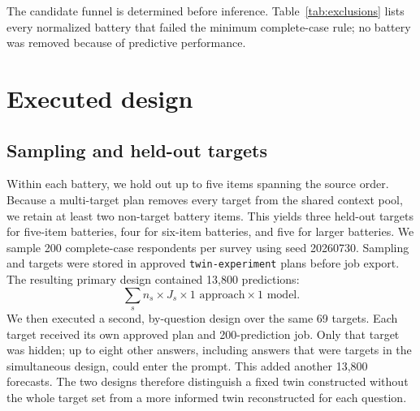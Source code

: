 \documentclass[11pt]{article}
\newcommand{\zwill}{\texttt{zwill}}
\begin{document}
\begin{table}[ht]
\centering
\scriptsize
\resizebox{\textwidth}{!}{}
\caption{Executed study cohort. Predictions equal sampled respondents times
held-out questions for one construction arm and one model.}
\label{tab:cohort}
\end{table}

The candidate funnel is determined before inference. Table~\ref{tab:exclusions}
lists every normalized battery that failed the minimum complete-case rule; no
battery was removed because of predictive performance.

\begin{table}[ht]
\centering
\small

\caption{Candidate normalized batteries excluded before plan approval and
remote inference. Reasons are read from the \zwill{} study manifest generated by
the ingestion pipeline.}
\label{tab:exclusions}
\end{table}

\section{Executed design}
\subsection{Sampling and held-out targets}
Within each battery, we hold out up to five items spanning the source order.
Because a multi-target plan removes every target from the shared context pool,
we retain at least two non-target battery items. This yields three held-out
targets for five-item batteries, four for six-item batteries, and five for
larger batteries. We sample 200 complete-case respondents per survey using
seed 20260730. Sampling and targets were stored in approved
\texttt{twin-experiment} plans before job export. The resulting primary design
contained 13,800 predictions:
\[
 \sum_s n_s \times J_s \times 1\text{ approach}\times1\text{ model}.
\]
We then executed a second, by-question design over the same 69 targets. Each
target received its own approved plan and 200-prediction job. Only that target
was hidden; up to eight other answers, including answers that were targets in
the simultaneous design, could enter the prompt. This added another 13,800
forecasts. The two designs therefore distinguish a fixed twin constructed
without the whole target set from a more informed twin reconstructed for each
question.
\end{document}
